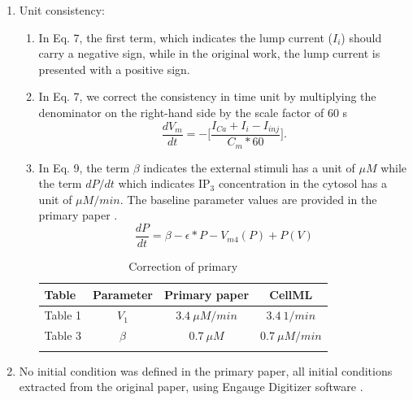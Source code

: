 \documentclass[fleqn,10pt]{physiome}
\begin{document}
\begin{enumerate}

\item Unit consistency:
\begin{enumerate}
\item In Eq. 7, the first term, which indicates the lump current ($I_{i}$) should carry a negative sign, while in the original work, the lump current is presented with a positive sign. 

\item In Eq. 7, we correct the consistency in time unit by multiplying the denominator on the right-hand side by the scale factor of 60 s
\begin{equation*}
\frac{dV_{m}}{dt} = - \Big[\frac{I_{Ca}+ I_{i}-I_{inj}}{C_{m}*60}\Big].
\end{equation*}
\item In Eq. 9,  the term $\beta$ indicates the external stimuli has a unit of $\mu M $ while the term $dP /dt$ which indicates IP$_{3}$ concentration in the cytosol has a unit of $\mu M /min$.
The baseline parameter values are provided in the primary paper \citet{imtiaz2002theoretical}.
\begin{equation*}
  \frac{dP}{dt} = \beta - \epsilon *  P  - V_{m4}(P) + P (V)
\end{equation*}



\begin{table}
\centering
\caption{Correction of primary \cite[Tables 1,2 \& 3]{imtiaz2002theoretical}}

\begin{tabular}{lccc}

\toprule
Table & Parameter & Primary paper & CellML \\
\midrule

Table 1 & $ V_{1}$ & $3.4 \ \mu M /min$ & $3.4\ 1 /min$ \\
Table 3 & $\beta$ & $0.7 \ \mu M $ &  $0.7 \ \mu M /min$  \\

\bottomrule
\label{tab:Inconsistency}
\end{tabular}
\end{table}
 \end{enumerate}

\item No initial condition was defined in the primary paper, all initial conditions extracted from the original paper, using Engauge Digitizer software \citep{mark_mitchell_2020_3941227}.


\end{enumerate}
\end{document}
